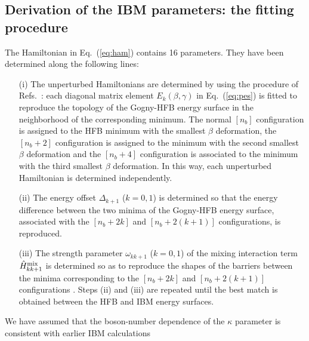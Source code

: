 \documentclass[twocolumn,showpacs,amsmath,amssymb,superscriptaddress]{revtex4-1}
\begin{document}

\subsection{Derivation of the IBM parameters: the fitting procedure\label{sec:mapping}}





The  Hamiltonian in Eq.~(\ref{eq:ham}) contains 16 parameters. They have 
been determined along the following lines:
 \begin{enumerate}
 \item[(i)] The unperturbed Hamiltonians are determined by using
	    the procedure of
	    Refs.~\cite{nomura2008,nomura2010,nomura2016zr}:
	    each diagonal matrix element $E_k(\beta,\gamma)$ in
	    Eq.~(\ref{eq:pes}) is fitted to reproduce the topology of
	    the Gogny-HFB energy surface in the neighborhood of the
	    corresponding minimum. 
	    The normal $[n_b]$ configuration is assigned to the HFB minimum
	    with the smallest $\beta$ deformation, the 
	    $[n_b+2]$ configuration is assigned to
	    the minimum with the second smallest $\beta$ deformation and
	    the $[n_b+4]$ configuration is associated to the 
	    minimum with the third
	    smallest $\beta$ deformation. 
	    In this way, each 
	    unperturbed Hamiltonian is determined
	    independently.	    	    		       	   	    
\item[(ii)] The energy offset $\Delta_{k+1}$ ($k=0,1$) is determined so
	    that the energy difference 
              between the two minima of the Gogny-HFB energy surface, associated 
	      with the $[n_b+2k]$ and
	    $[n_b+2(k+1)]$ configurations,  is
	          reproduced. 	    		  		  				  
\item[(iii)] The strength parameter $\omega_{kk+1}$ ($k=0,1$)
	     of the mixing interaction term $\hat H^{\rm mix}_{kk+1}$
	     is determined so as to reproduce the shapes of the barriers
	     between the minima  corresponding to the $[n_b+2k]$ and 
	    $[n_b+2(k+1)]$ configurations
	     \cite{nomura2012sc,nomura2013hg}. Steps (ii) and (iii) are
	     repeated until the best match is obtained between the HFB
	     and IBM energy surfaces. 	     
\end{enumerate}
We have assumed that the boson-number dependence of the
$\kappa$ parameter is consistent with  earlier IBM calculations 
\end{document}
